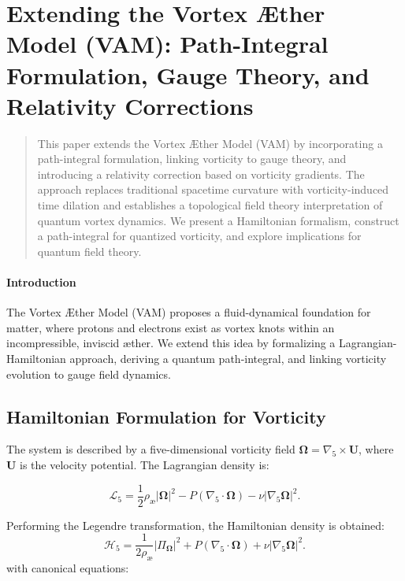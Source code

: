 \usepackage{amsmath}

\section{Extending the Vortex Æther Model (VAM): Path-Integral Formulation, Gauge Theory, and Relativity Corrections}\label{sec:extending-the-vortex-ther-model-(vam):-path-integral-formulation-gauge-theory-and-relativity-corrections}


\begin{abstract}
This paper extends the Vortex Æther Model (VAM) by incorporating a path-integral formulation, linking vorticity to gauge theory, and introducing a relativity correction based on vorticity gradients.
The approach replaces traditional spacetime curvature with vorticity-induced time dilation and establishes a topological field theory interpretation of quantum vortex dynamics.
We present a Hamiltonian formalism, construct a path-integral for quantized vorticity, and explore implications for quantum field theory.
\end{abstract}

\paragraph*{Introduction}
The Vortex Æther Model (VAM) proposes a fluid-dynamical foundation for matter, where protons and electrons exist as vortex knots within an incompressible, inviscid æther.
We extend this idea by formalizing a Lagrangian-Hamiltonian approach, deriving a quantum path-integral, and linking vorticity evolution to gauge field dynamics.

\subsection{Hamiltonian Formulation for Vorticity}
The system is described by a five-dimensional vorticity field $\boldsymbol{\Omega} = \nabla_5 \times \mathbf{U}$, where $\mathbf{U}$ is the velocity potential. The Lagrangian density is:

\begin{equation}
    \mathcal{L}_5 = \frac{1}{2} \rho_{\text{æ}} |\boldsymbol{\Omega}|^2 - P (\nabla_5 \cdot \boldsymbol{\Omega}) - \nu |\nabla_5 \boldsymbol{\Omega}|^2.
\end{equation}

Performing the Legendre transformation, the Hamiltonian density is obtained:
\begin{equation}
    \mathcal{H}_5 = \frac{1}{2 \rho_{\text{æ}}} |\Pi_{\boldsymbol{\Omega}}|^2 + P (\nabla_5 \cdot \boldsymbol{\Omega}) + \nu |\nabla_5 \boldsymbol{\Omega}|^2.
\end{equation}
with canonical equations:

